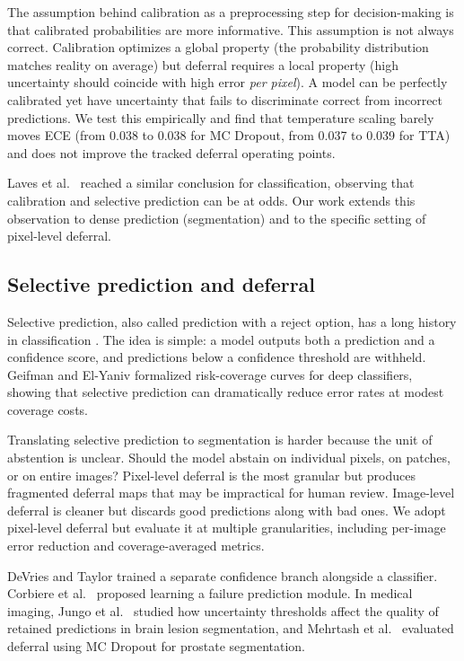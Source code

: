 The assumption behind calibration as a preprocessing step for decision-making
is that calibrated probabilities are more informative. This assumption is not
always correct. Calibration optimizes a global property (the probability
distribution matches reality on average) but deferral requires a local
property (high uncertainty should coincide with high error \emph{per pixel}).
A model can be perfectly calibrated yet have uncertainty that fails to
discriminate correct from incorrect predictions. We test this empirically
and find that temperature scaling barely moves ECE (from 0.038 to 0.038 for
MC Dropout, from 0.037 to 0.039 for TTA) and does not improve the tracked
deferral operating points.

Laves et al.\ \citep{laves2020well} reached a similar conclusion for
classification, observing that calibration and selective prediction can be
at odds. Our work extends this observation to dense prediction (segmentation)
and to the specific setting of pixel-level deferral.

\subsection{Selective prediction and deferral}

Selective prediction, also called prediction with a reject option, has a long
history in classification \citep{chow1970optimum,el2010foundations}. The idea
is simple: a model outputs both a prediction and a confidence score, and
predictions below a confidence threshold are withheld. Geifman and El-Yaniv
\citep{geifman2017selective} formalized risk-coverage curves for deep
classifiers, showing that selective prediction can dramatically reduce error
rates at modest coverage costs.

Translating selective prediction to segmentation is harder because the unit
of abstention is unclear. Should the model abstain on individual pixels, on
patches, or on entire images? Pixel-level deferral is the most granular but
produces fragmented deferral maps that may be impractical for human review.
Image-level deferral is cleaner but discards good predictions along with
bad ones. We adopt pixel-level deferral but evaluate it at multiple
granularities, including per-image error reduction and coverage-averaged
metrics.

DeVries and Taylor \citep{devries2018learning} trained a separate confidence
branch alongside a classifier. Corbiere et al.\ \citep{corbiere2019addressing}
proposed learning a failure prediction module. In medical imaging, Jungo et al.\
\citep{jungo2020analyzing} studied how uncertainty thresholds affect the
quality of retained predictions in brain lesion segmentation, and
Mehrtash et al.\ \citep{mehrtash2020confidence} evaluated deferral using
MC Dropout for prostate segmentation.

